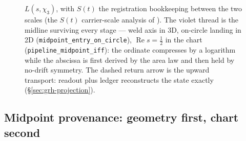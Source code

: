 \documentclass[11pt]{article}
\theoremstyle{definition}
\renewcommand{\Re}{\operatorname{Re}}
\begin{document}
\begin{figure}[p]
{\(L(s,\chi_3)\), with \(S(t)\) the registration bookkeeping between the two
scales (the \(S(t)\) carrier-scale analysis of \cite{UniversalCarrier}).
The violet thread is the midline surviving
every stage --- weld axis in 3D, on-circle landing in 2D
(\texttt{midpoint\_entry\_on\_circle}), \(\Re s=\tfrac12\) in the chart
(\texttt{pipeline\_midpoint\_iff}): the ordinate compresses by a logarithm
while the abscissa is first derived by the area law and then held by
no-drift symmetry. The dashed return arrow is the
upward transport: readout plus ledger reconstructs the state exactly
(\S\ref{sec:grh-projection}).}
\label{fig:grh-pipeline}
\end{figure}


\subsection{Midpoint provenance: geometry first, chart second}
\label{sec:grh-midpoint-provenance}
\end{document}

